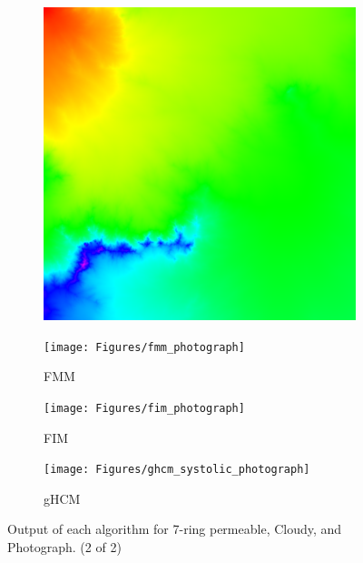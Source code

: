 \documentclass[11pt]{article}       %
\begin{document}
\begin{figure}
\begin{subfigure}[b]{.3\columnwidth}
	\end{subfigure}
	\begin{subfigure}[b]{.3\columnwidth}
		\includegraphics[width=\textwidth]{Figures/ghcm_systolic_cloudy}
	\end{subfigure}
	
	\begin{subfigure}[b]{.3\columnwidth}
		\texttt{[image: Figures/fmm\_photograph]}
		\caption{FMM}
	\end{subfigure}
	\begin{subfigure}[b]{.3\columnwidth}
		\texttt{[image: Figures/fim\_photograph]}
		\caption{FIM}
	\end{subfigure}
	\begin{subfigure}[b]{.3\columnwidth}
		\texttt{[image: Figures/ghcm\_systolic\_photograph]}
		\caption{gHCM}
	\end{subfigure}
	
	\caption{Output of each algorithm for 7-ring permeable, Cloudy, and Photograph. (2 of 2)}
	\label{fig:output_2}
\end{figure}
\end{document}
